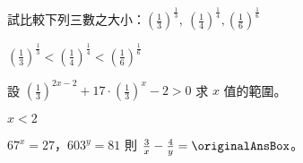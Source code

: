 \begin{QUESTIONS}
\begin{QUESTION}
    \begin{QBODY}
        試比較下列三數之大小：${{\left( \frac{1}{3} \right)}^{\tfrac{1}{3}}},\ {{\left( \frac{1}{4} \right)}^{\tfrac{1}{4}}},{{\left( \frac{1}{6} \right)}^{\tfrac{1}{6}}}$
    \end{QBODY}
    \begin{QFROMS}
    \end{QFROMS}
    \begin{QTAGS} \end{QTAGS}
    \begin{QANS}
        ${{\left( \frac{1}{3} \right)}^{\tfrac{1}{3}}}<{{\left( \frac{1}{4} \right)}^{\tfrac{1}{4}}}<{{\left( \frac{1}{6} \right)}^{\tfrac{1}{6}}}$
    \end{QANS}
    \begin{QSOL}
    \end{QSOL}
    \begin{QEMPTYSPACE}
    \end{QEMPTYSPACE}
\end{QUESTION}
\begin{QUESTION}
    \begin{QBODY}
        設 ${{\left( \frac{1}{3} \right)}^{2x-2}}+17\cdot {{\left( \frac{1}{3} \right)}^{x}}-2>0$ 求 $x$ 值的範圍。
    \end{QBODY}
    \begin{QFROMS}
    \end{QFROMS}
    \begin{QTAGS} \end{QTAGS}
    \begin{QANS}
        $x<2$
    \end{QANS}
    \begin{QSOL}
    \end{QSOL}
    \begin{QEMPTYSPACE}
    \end{QEMPTYSPACE}
\end{QUESTION}
\begin{QUESTION}
    \begin{QBODY}
        ${{67}^{x}}=27$，${{603}^{y}}=81$ 則 $\frac{3}{x}-\frac{4}{y}=\originalAnsBox$。
    \end{QBODY}
    \begin{QFROMS}
    \end{QFROMS}
    \begin{QTAGS} \end{QTAGS}
    \begin{QANS}
    \end{QANS}

\end{QUESTION}
\end{QUESTIONS}
